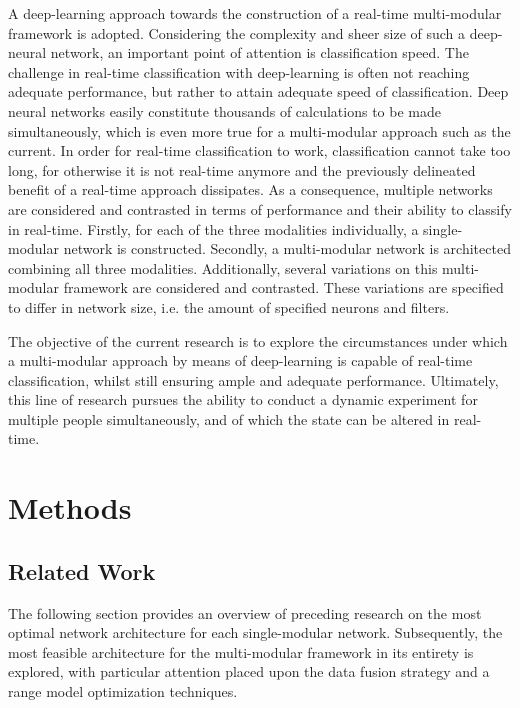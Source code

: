 \documentclass[12pt]{article}
\begin{document}
A deep-learning approach towards the construction of a real-time multi-modular framework is adopted. Considering the complexity and sheer size of such a deep-neural network, an important point of attention is classification speed. The challenge in real-time classification with deep-learning is often not reaching adequate performance, but rather to attain adequate speed of classification. Deep neural networks easily constitute thousands of calculations to be made simultaneously, which is even more true for a multi-modular approach such as the current. In order for real-time classification to work, classification cannot take too long, for otherwise it is not real-time anymore and the previously delineated benefit of a real-time approach dissipates. As a consequence, multiple networks are considered and contrasted in terms of performance and their ability to classify in real-time. Firstly, for each of the three modalities individually, a single-modular network is constructed. Secondly, a multi-modular network is architected combining all three modalities. Additionally, several variations on this multi-modular framework are considered and contrasted. These variations are specified to differ in network size, i.e. the amount of specified neurons and filters. 

The objective of the current research is to explore the circumstances under which a multi-modular approach by means of deep-learning is capable of real-time classification, whilst still ensuring ample and adequate performance. Ultimately, this line of research pursues the ability to conduct a dynamic experiment for multiple people simultaneously, and of which the state can be altered in real-time. 

\newpage
\section{Methods}

\subsection{Related Work} 
The following section provides an overview of preceding research on the most optimal network architecture for each single-modular network. Subsequently, the most feasible architecture for the multi-modular framework in its entirety is explored, with particular attention placed upon the data fusion strategy and a range model optimization techniques.
\end{document}
